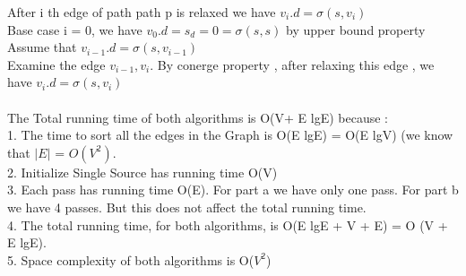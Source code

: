 \documentclass[11 pt]{article}
\begin{document}
After i th edge of path path p is relaxed  we have $v_i.d = \sigma (s, v_i)$\\
 Base case i = 0, we have $v_0.d = s_d = 0 = \sigma (s,s)$ by upper bound property\\
Assume that $v_{i-1}.d = \sigma (s, v_{i-1})$ \\
Examine the edge $v_{i-1} , v_i$. By conerge property , after relaxing this edge , we have $v_i.d = \sigma(s,v_i)$\\ \\
 
 
 The Total running time of both algorithms is O(V+ E lgE) because :\\
 1. The time to sort all the edges in the Graph is O(E lgE) = O(E lgV) (we know that $|E|$ = $O (V^2)$.\\
 2. Initialize Single Source has running time O(V)\\
 3. Each pass has running time O(E). For part a we have only one pass. For part b we have 4 passes. But this does not affect the total running time.\\
 4. The total running time, for both algorithms, is O(E lgE + V + E) = O (V + E lgE).\\
 5. Space complexity of both algorithms is O($V^2$)\\
\end{document}
